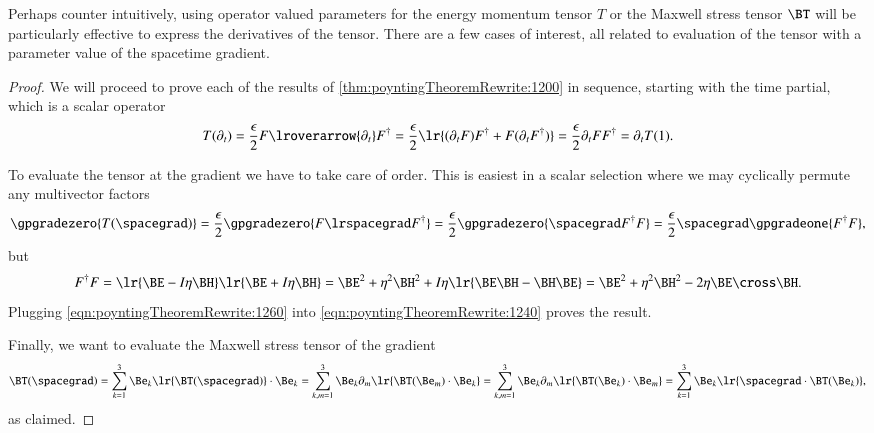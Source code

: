 Perhaps counter intuitively, using operator valued parameters for the energy momentum tensor \( T \) or the Maxwell stress tensor \( \BT \) will be particularly effective to express the derivatives of the tensor.  There are a few cases of interest, all related to evaluation of the tensor with a parameter value of the spacetime gradient.
\index{\(\BT(\spacegrad)\)}
\begin{proof}
We will proceed to prove each of the results of
\cref{thm:poyntingTheoremRewrite:1200} in sequence, starting with the time partial, which is a scalar operator
\begin{dmath}\label{eqn:poyntingTheoremRewrite:1220}
T(\partial_t)
=
\frac{\epsilon}{2}
 F \lroverarrow{\partial_t} F^\dagger
=
\frac{\epsilon}{2}
\lr{
 (\partial_t F) F^\dagger
+
 F (\partial_t F^\dagger)
}
=
\frac{\epsilon}{2}
\partial_t
 F F^\dagger
=
\partial_t T(1).
\end{dmath}

To evaluate the tensor at the gradient we have to take care of order.  This is easiest in a scalar selection where we may cyclically permute any multivector factors
\begin{dmath}\label{eqn:poyntingTheoremRewrite:1240}
\gpgradezero{T(\spacegrad)}
=
\frac{\epsilon}{2}
\gpgradezero{
 F \lrspacegrad F^\dagger
}
=
\frac{\epsilon}{2}
\gpgradezero{
 \spacegrad F^\dagger F
}
=
\frac{\epsilon}{2} \spacegrad \gpgradeone{ F^\dagger F },
\end{dmath}
but
\begin{dmath}\label{eqn:poyntingTheoremRewrite:1260}
F^\dagger F
=
\lr{ \BE - I \eta \BH } \lr{ \BE + I \eta \BH }
=
\BE^2 + \eta^2 \BH^2 + I \eta \lr{ \BE \BH - \BH \BE }
=
\BE^2 + \eta^2 \BH^2 - 2 \eta \BE \cross \BH.
\end{dmath}
Plugging \cref{eqn:poyntingTheoremRewrite:1260} into \cref{eqn:poyntingTheoremRewrite:1240} proves the result.

Finally, we want to evaluate the Maxwell stress tensor of the gradient
\begin{dmath}\label{eqn:poyntingTheoremRewrite:260}
\BT(\spacegrad)
=
\sum_{k = 1}^3 \Be_k \lr{ \BT(\spacegrad) } \cdot \Be_k
=
\sum_{k,m = 1}^3 \Be_k \partial_m \lr{ \BT(\Be_m) \cdot \Be_k }
=
\sum_{k,m = 1}^3 \Be_k \partial_m \lr{ \BT(\Be_k) \cdot \Be_m }
=
\sum_{k = 1}^3 \Be_k \lr{ \spacegrad \cdot \BT(\Be_k) },
\end{dmath}
as claimed.
\end{proof}

